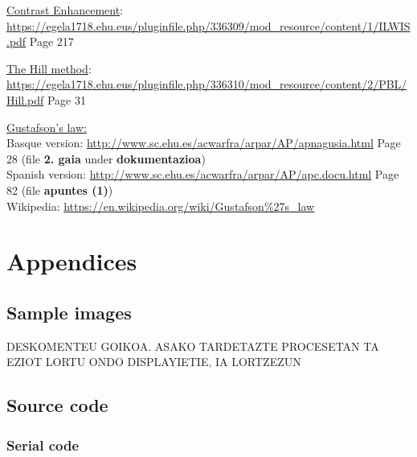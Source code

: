 \documentclass[12pt]{article}
\begin{document}
\begin{thebibliography}{9}

\underline{Contrast Enhancement}:\\
\url{https://egela1718.ehu.eus/pluginfile.php/336309/mod_resource/content/1/ILWIS.pdf} Page 217

\underline{The Hill method}:\\
\url{https://egela1718.ehu.eus/pluginfile.php/336310/mod_resource/content/2/PBL/Hill.pdf} Page 31

\underline{Gustafson's law:}\\
Basque version: \url{http://www.sc.ehu.es/acwarfra/arpar/AP/apnagusia.html} Page 28 (file \textbf{2. gaia} under \textbf{dokumentazioa})\\
Spanish version: \url{http://www.sc.ehu.es/acwarfra/arpar/AP/apc.docu.html} Page 82 (file \textbf{apuntes (1)})\\
Wikipedia: \url{https://en.wikipedia.org/wiki/Gustafson%27s_law}


\end{thebibliography}

\section{Appendices}

\subsection{Sample images}\label{images}


DESKOMENTEU GOIKOA. ASAKO TARDETAZTE PROCESETAN TA EZIOT LORTU ONDO DISPLAYIETIE, IA LORTZEZUN

\subsection{Source code}

\subsubsection{Serial code}\label{serial_code}
\end{document}
